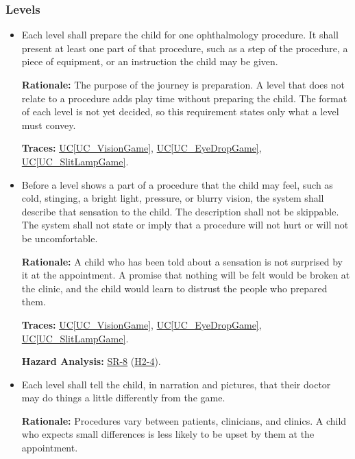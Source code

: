 \documentclass[12pt]{article}
\newcommand{\ucref}[1]{\hyperref[#1]{UC\ref*{#1}}}
\newcounter{reqnum} %
\newcommand{\haurl}{https://team-hindsight.github.io/ophthamology-game/HazardAnalysis/HazardAnalysis.pdf}
\newcommand{\hasrref}[2]{\href{\haurl\#nameddest=sr:#1}{SR-#2}}
\newcommand{\hahazref}[2]{\href{\haurl\#nameddest=haz:#1}{H#2}}
\newcommand{\hazsr}[4]{\hasrref{#1}{#2} (\hahazref{#3}{#4})}
\begin{document}
\subsubsection{Levels}
\label{sec_FRGameplay}

\begin{itemize}

\item[\refstepcounter{reqnum}\textbf{FR\thereqnum}\label{FR_LevelContent}:]
Each level shall prepare the child for one ophthalmology procedure. It shall
present at least one part of that procedure, such as a step of the procedure,
a piece of equipment, or an instruction the child may be given.

\textbf{Rationale:} The purpose of the journey is preparation. A level that
does not relate to a procedure adds play time without preparing the child. The
format of each level is not yet decided, so this requirement states only what
a level must convey.

\textbf{Traces:} \ucref{UC_VisionGame}, \ucref{UC_EyeDropGame},
\ucref{UC_SlitLampGame}.

\item[\refstepcounter{reqnum}\textbf{FR\thereqnum}\label{FR_DescribeSensations}:]
Before a level shows a part of a procedure that the child may feel, such
as cold, stinging, a bright light, pressure, or blurry vision, the system shall
describe that sensation to the child. The description shall not be skippable.
The system shall not state or imply that a procedure will not hurt or will not
be uncomfortable.

\textbf{Rationale:} A child who has been told about a sensation is not surprised by it at the
appointment. A promise that nothing will be felt would be broken at the
clinic, and the child would learn to distrust the people who prepared them.

\textbf{Traces:} \ucref{UC_VisionGame}, \ucref{UC_EyeDropGame},
\ucref{UC_SlitLampGame}.

\textbf{Hazard Analysis:} \hazsr{HonestSensations}{8}{SensationsHidden}{2-4}.

\item[\refstepcounter{reqnum}\textbf{FR\thereqnum}\label{FR_ClinicsDiffer}:]
Each level shall tell the child, in narration and pictures, that their
doctor may do things a little differently from the game.

\textbf{Rationale:} Procedures vary between patients, clinicians, and clinics. A child who
expects small differences is less likely to be upset by them at the
appointment.


\end{itemize}
\end{document}
